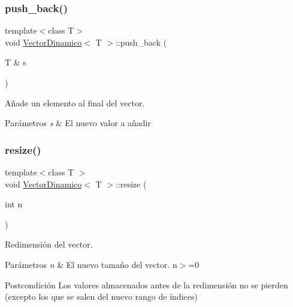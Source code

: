 \subsubsection{\texorpdfstring{push\+\_\+back()}{push\_back()}}
{\footnotesize\ttfamily template$<$class T$>$ \\
void \hyperlink{classVectorDinamico}{Vector\+Dinamico}$<$ T $>$\+::push\+\_\+back (\begin{DoxyParamCaption}\item[{T \&}]{s }\end{DoxyParamCaption})}



Añade un elemento al final del vector. 


\begin{DoxyParams}{Parámetros}
{\em s} & El nuevo valor a añadir \\
\hline
\end{DoxyParams}
\mbox{\label{classVectorDinamico_a9b3fd8907bc3ca9b5bc5775bbb11f867}} 
\subsubsection{\texorpdfstring{resize()}{resize()}}
{\footnotesize\ttfamily template$<$class T $>$ \\
void \hyperlink{classVectorDinamico}{Vector\+Dinamico}$<$ T $>$\+::resize (\begin{DoxyParamCaption}\item[{int}]{n }\end{DoxyParamCaption})}



Redimensión del vector. 


\begin{DoxyParams}{Parámetros}
{\em n} & El nuevo tamaño del vector. n$>$=0 \\
\hline
\end{DoxyParams}
\begin{DoxyPostcond}{Postcondición}
Los valores almacenados antes de la redimensión no se pierden (excepto los que se salen del nuevo rango de índices) 
\end{DoxyPostcond}
\mbox{\label{classVectorDinamico_a170abdfac52375020f44bc3903f23b65}} 
